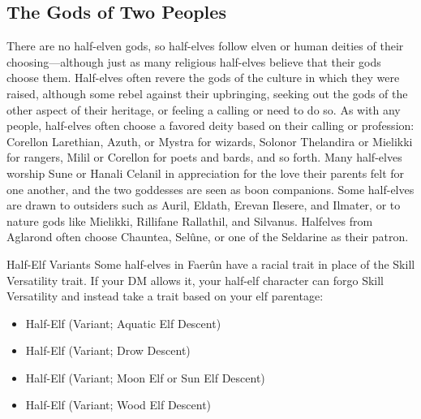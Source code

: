 \documentclass[10pt,a4paper,twoside,twocolumn,openany,bg=print,nodeprecatedcode]{dndbook}
\begin{document}
\subsection{The Gods of Two Peoples}
There are no half-elven gods, so half-elves follow elven or human deities of their choosing—although just as many religious half-elves believe that their gods choose them. Half-elves often revere the gods of the culture in which they were raised, although some rebel against their upbringing, seeking out the gods of the other aspect of their heritage, or feeling a calling or need to do so.
As with any people, half-elves often choose a favored deity based on their calling or profession: Corellon Larethian, Azuth, or Mystra for wizards, Solonor Thelandira or Mielikki for rangers, Milil or Corellon for poets and bards, and so forth.
Many half-elves worship Sune or Hanali Celanil in appreciation for the love their parents felt for one another, and the two goddesses are seen as boon companions. Some half-elves are drawn to outsiders such as Auril, Eldath, Erevan Ilesere, and Ilmater, or to nature gods like Mielikki, Rillifane Rallathil, and Silvanus. Halfelves from Aglarond often choose Chauntea, Selûne, or one of the Seldarine as their patron.
\begin{DndComment}{Half-Elf Variants}
Some half-elves in Faerûn have a racial trait in place of the Skill Versatility trait. If your DM allows it, your half-elf character can forgo Skill Versatility and instead take a trait based on your elf parentage:

\begin{itemize}
\item Half-Elf (Variant; Aquatic Elf Descent)
\item Half-Elf (Variant; Drow Descent)
\item Half-Elf (Variant; Moon Elf or Sun Elf Descent)
\item Half-Elf (Variant; Wood Elf Descent)
\end{itemize}

\end{DndComment}
\end{document}

